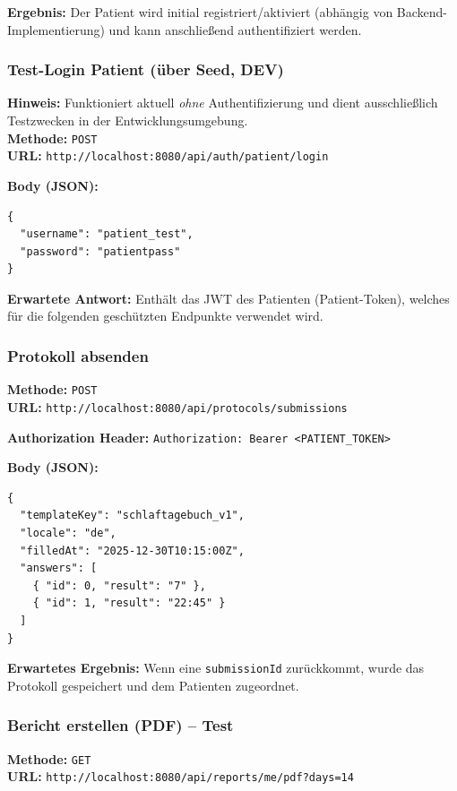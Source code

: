 \textbf{Ergebnis:} Der Patient wird initial registriert/aktiviert (abhängig von Backend-Implementierung) und kann anschließend authentifiziert werden.

\subsubsection{Test-Login Patient (über Seed, DEV)}
\textbf{Hinweis:} Funktioniert aktuell \emph{ohne} Authentifizierung und dient ausschließlich Testzwecken in der Entwicklungsumgebung.\\
\textbf{Methode:} \texttt{POST}\\
\textbf{URL:} \texttt{http://localhost:8080/api/auth/patient/login}

\textbf{Body (JSON):}
\begin{verbatim}
{
  "username": "patient_test",
  "password": "patientpass"
}
\end{verbatim}

\textbf{Erwartete Antwort:} Enthält das JWT des Patienten (Patient-Token), welches für die folgenden geschützten Endpunkte verwendet wird.

\subsubsection{Protokoll absenden}
\textbf{Methode:} \texttt{POST}\\
\textbf{URL:} \texttt{http://localhost:8080/api/protocols/submissions}

\textbf{Authorization Header:} \texttt{Authorization: Bearer <PATIENT\_TOKEN>}

\textbf{Body (JSON):}
\begin{verbatim}
{
  "templateKey": "schlaftagebuch_v1",
  "locale": "de",
  "filledAt": "2025-12-30T10:15:00Z",
  "answers": [
    { "id": 0, "result": "7" },
    { "id": 1, "result": "22:45" }
  ]
}
\end{verbatim}

\textbf{Erwartetes Ergebnis:} Wenn eine \texttt{submissionId} zurückkommt, wurde das Protokoll gespeichert und dem Patienten zugeordnet.

\subsubsection{Bericht erstellen (PDF) -- Test}
\textbf{Methode:} \texttt{GET}\\
\textbf{URL:} \texttt{http://localhost:8080/api/reports/me/pdf?days=14}

